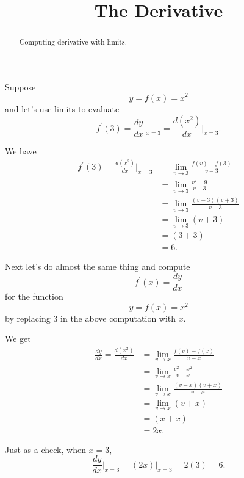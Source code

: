 \documentclass{ximera}
\title{The Derivative}
\begin{document}
\begin{abstract}
Computing derivative with limits.
\end{abstract}
\maketitle
  


\begin{example}  \label{Ex:43tggt5t5}
Suppose 
\[
    y = f(x) = x^2
\]
and let's use limits to evaluate
\[
    f^\prime(3) =   \frac{dy}{dx}\Big|_{x=3} = \frac{d(x^2)}{dx}\Big|_{x=3} .
\]

We have
\begin{align*}
 f^\prime(3) = \frac{d(x^2)}{dx}\Big|_{x=3} &= \lim_{v\to 3} \frac{f(v)-f(3)}{v-3} \\
                                              &= \lim_{v\to 3} \frac{v^2 - 9}{v-3} \\
                                              &= \lim_{v\to 3} \frac{(v-3)(v+3)}{v-3} \\
                                             &= \lim_{v\to 3} (v+3) \\
                                           &= (3+3)  \\
                                           &= 6 .
\end{align*}

Next let's do almost the same thing and compute
\[
   f^\prime(x) =   \frac{dy}{dx}
\] 
for the function
\[
   y = f(x) = x^2 
\]
by replacing $3$ in the above computation with $x$. 

We get
\begin{align*}
 \frac{dy}{dx}= \frac{d(x^2)}{dx}&= \lim_{v\to x} \frac{f(v)-f(x)}{v-x} \\
                                              &= \lim_{v\to x} \frac{v^2 - x^2}{v-x} \\
                                              &= \lim_{v\to x} \frac{(v-x)(v+x)}{v-x} \\
                                             &= \lim_{v\to x} (v+x) \\
                                           &= (x+x)  \\
                                           &= 2x .
\end{align*}

Just as a check, when $x=3$,
\[
   \frac{dy}{dx}\Big|_{x=3} = (2x)\Big|_{x=3} = 2(3) = 6.
\]
\end{example}
\end{document}
